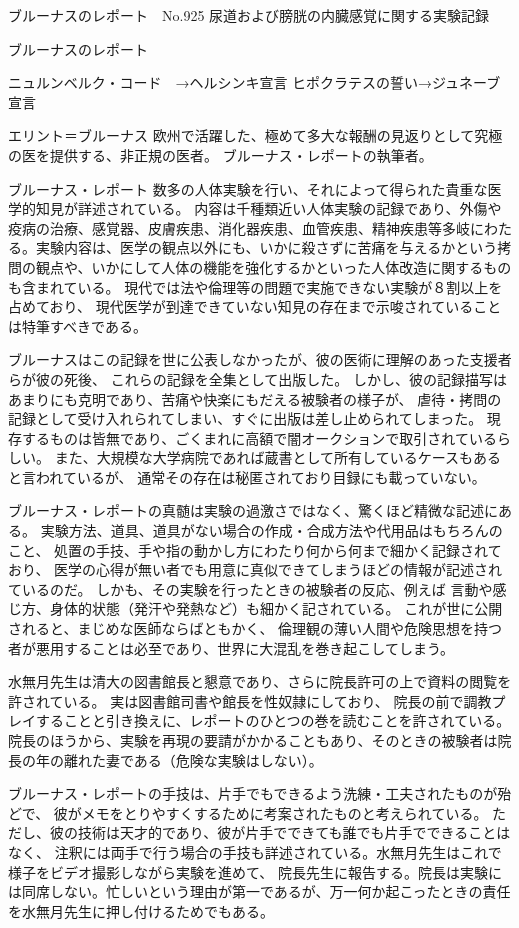 ブルーナスのレポート　No.925
尿道および膀胱の内臓感覚に関する実験記録


ブルーナスのレポート


ニュルンベルク・コード　→ヘルシンキ宣言
ヒポクラテスの誓い→ジュネーブ宣言

エリント＝ブルーナス
欧州で活躍した、極めて多大な報酬の見返りとして究極の医を提供する、非正規の医者。
ブルーナス・レポートの執筆者。

ブルーナス・レポート
数多の人体実験を行い、それによって得られた貴重な医学的知見が詳述されている。
内容は千種類近い人体実験の記録であり、外傷や疫病の治療、感覚器、皮膚疾患、消化器疾患、血管疾患、精神疾患等多岐にわたる。実験内容は、医学の観点以外にも、いかに殺さずに苦痛を与えるかという拷問の観点や、いかにして人体の機能を強化するかといった人体改造に関するものも含まれている。
現代では法や倫理等の問題で実施できない実験が８割以上を占めており、
現代医学が到達できていない知見の存在まで示唆されていることは特筆すべきである。


ブルーナスはこの記録を世に公表しなかったが、彼の医術に理解のあった支援者らが彼の死後、
これらの記録を全集として出版した。
しかし、彼の記録描写はあまりにも克明であり、苦痛や快楽にもだえる被験者の様子が、
虐待・拷問の記録として受け入れられてしまい、すぐに出版は差し止められてしまった。
現存するものは皆無であり、ごくまれに高額で闇オークションで取引されているらしい。
また、大規模な大学病院であれば蔵書として所有しているケースもあると言われているが、
通常その存在は秘匿されており目録にも載っていない。



ブルーナス・レポートの真髄は実験の過激さではなく、驚くほど精微な記述にある。
実験方法、道具、道具がない場合の作成・合成方法や代用品はもちろんのこと、
処置の手技、手や指の動かし方にわたり何から何まで細かく記録されており、
医学の心得が無い者でも用意に真似できてしまうほどの情報が記述されているのだ。
しかも、その実験を行ったときの被験者の反応、例えば
言動や感じ方、身体的状態（発汗や発熱など）も細かく記されている。
これが世に公開されると、まじめな医師ならばともかく、
倫理観の薄い人間や危険思想を持つ者が悪用することは必至であり、世界に大混乱を巻き起こしてしまう。

水無月先生は清大の図書館長と懇意であり、さらに院長許可の上で資料の閲覧を許されている。
実は図書館司書や館長を性奴隷にしており、
院長の前で調教プレイすることと引き換えに、レポートのひとつの巻を読むことを許されている。
院長のほうから、実験を再現の要請がかかることもあり、そのときの被験者は院長の年の離れた妻である（危険な実験はしない）。


ブルーナス・レポートの手技は、片手でもできるよう洗練・工夫されたものが殆どで、
彼がメモをとりやすくするために考案されたものと考えられている。
ただし、彼の技術は天才的であり、彼が片手でできても誰でも片手でできることはなく、
注釈には両手で行う場合の手技も詳述されている。水無月先生はこれで様子をビデオ撮影しながら実験を進めて、
院長先生に報告する。院長は実験には同席しない。忙しいという理由が第一であるが、万一何か起こったときの責任を水無月先生に押し付けるためでもある。

